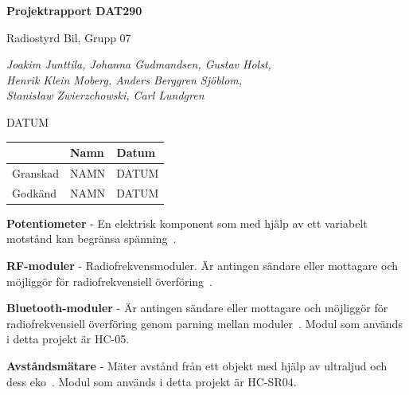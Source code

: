 \documentclass[a4paper]{article}
\begin{document}
\begin{titlepage}
\centering
{\bfseries\huge Projektrapport DAT290}

\vspace{10mm}

{\Large Radiostyrd Bil, Grupp 07}

\vspace{20mm}

{\Large \itshape{Joakim Junttila, Johanna Gudmandsen, Gustav Holst,\\Henrik Klein Moberg, Anders Berggren Sjöblom, \\[1mm] Stanisław Zwierzchowski, Carl Lundgren}}

\vspace{10mm}

{DATUM}


\normalsize{
\begin{table}[b]
\centering
\begin{tabular}{|l|l|l|}  \hline
         & \bf Namn & \bf Datum   \\ \hline \hline
Granskad & NAMN     & DATUM        \\ \hline
Godkänd  & NAMN     & DATUM         \\ \hline
\end{tabular} 
\end{table}}
\end{titlepage}

\tableofcontents

\newpage
{}

\vspace{5mm} \noindent
{\bf Potentiometer} - En elektrisk komponent som med hjälp av ett variabelt motstånd kan begränsa spänning~\cite{Potentiometer}.

\vspace{5mm} \noindent
{\bf RF-moduler} - Radiofrekvensmoduler. Är antingen sändare eller mottagare och möjliggör för radiofrekvensiell överföring~\cite{RFModule}.

\vspace{5mm} \noindent
{\bf Bluetooth-moduler} - Är antingen sändare eller mottagare och möjliggör för radiofrekvensiell överföring genom parning mellan moduler~\cite{Bluetooth}. Modul som används i detta projekt är HC-05.


\vspace{5mm} \noindent
{\bf Avståndsmätare} - Mäter avstånd från ett objekt med hjälp av ultraljud och dess eko~\cite{DistMeasure}. Modul som används i detta projekt är HC-SR04.
\end{document}
